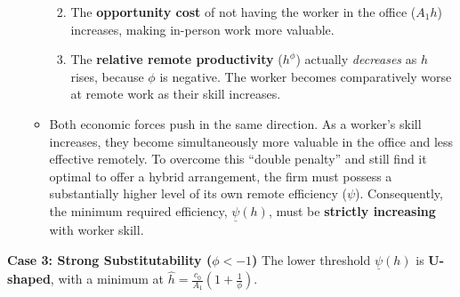 \documentclass[
  11pt,
  letterpaper,
  DIV=11,
  numbers=noendperiod]{scrartcl}
\providecommand{\tightlist}{%
  \setlength{\itemsep}{0pt}\setlength{\parskip}{0pt}}\usepackage{longtable,booktabs,array}
\begin{document}
\begin{itemize}
\begin{itemize}
    \begin{enumerate}
    \def\labelenumi{\arabic{enumi}.}
    \tightlist
    \item
      The \textbf{opportunity cost} of not having the worker in the
      office (\(A_1 h\)) increases, making in-person work more valuable.
    \item
      The \textbf{relative remote productivity} (\(h^\phi\)) actually
      \emph{decreases} as \(h\) rises, because \(\phi\) is negative. The
      worker becomes comparatively worse at remote work as their skill
      increases.
    \end{enumerate}
  \item
    Both economic forces push in the same direction. As a worker's skill
    increases, they become simultaneously more valuable in the office
    and less effective remotely. To overcome this ``double penalty'' and
    still find it optimal to offer a hybrid arrangement, the firm must
    possess a substantially higher level of its own remote efficiency
    (\(\psi\)). Consequently, the minimum required efficiency,
    \(\underline{\psi}(h)\), must be \textbf{strictly increasing} with
    worker skill.
  \end{itemize}
\end{itemize}

\textbf{Case 3: Strong Substitutability (\(\phi < -1\))} The lower
threshold \(\underline{\psi}(h)\) is \textbf{U-shaped}, with a minimum
at \(\hat{h} = \frac{c_0}{A_1}(1 + \frac{1}{\phi})\).
\end{document}

